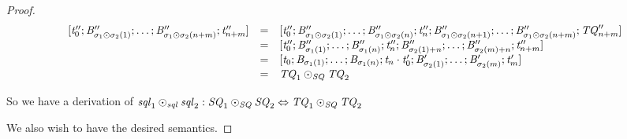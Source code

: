\documentclass[numbers,10pt,preprint\ifanon ,nocopyrightspace\fi]{sigplanconf}
\begin{document}
\begin{proof}
  \[
    \begin{array}{rcl}
      [\mathit{t}_0'';\mathit{B}_{\sigma_1\odot\sigma_2(1)}'';\ldots;
      \mathit{B}_{\sigma_1\odot\sigma_2(n+m)}'';\mathit{t}_{n+m}'']
      & = &
            [\mathit{t}_0'';\mathit{B}_{\sigma_1\odot\sigma_2(1)}'';
            \ldots;\mathit{B}_{\sigma_1\odot\sigma_2(n)}'';
            \mathit{t}_n'';\mathit{B}_{\sigma_1\odot\sigma_2(n+1)}'';
            \ldots;
            \mathit{B}_{\sigma_1\odot\sigma_2(n+m)}'';\mathit{TQ}_{n+m}'']\\
      & = &
            [\mathit{t}_0'';\mathit{B}_{\sigma_1(1)}'';
            \ldots;\mathit{B}_{\sigma_1(n)}'';
            \mathit{t}_n'';\mathit{B}_{\sigma_2(1)+n}'';
            \ldots;
            \mathit{B}_{\sigma_2(m)+n}'';\mathit{t}_{n+m}'']\\
      & = &
            [\mathit{t}_0;\mathit{B}_{\sigma_1(1)};
            \ldots;\mathit{B}_{\sigma_1(n)};
            \mathit{t}_n\cdot\mathit{t}_0';\mathit{B}_{\sigma_2(1)}';
            \ldots;
            \mathit{B}_{\sigma_2(m)}';\mathit{t}_m']\\
      & = & \mathit{TQ}_1\odot_{\mathit{SQ}}\mathit{TQ}_2
    \end{array}
  \]

  So we have a derivation of $\mathit{sql}_1\odot_{\mathit{sql}}\mathit{sql}_2 :
  \mathit{SQ}_1\odot_{\mathit{SQ}}\mathit{SQ}_2 \Leftrightarrow
  \mathit{TQ}_1\odot_{\mathit{SQ}}\mathit{TQ}_2$

  We also wish to have the desired semantics.


\end{proof}
\end{document}

